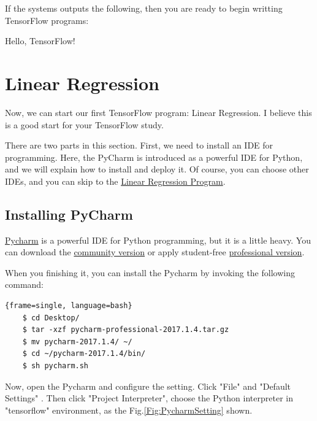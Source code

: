 \documentclass[12pt,letterpaper]{article}
\begin{document}
	If the systems outputs the following, then you are ready to begin writting TensorFlow programs:
	\begin{python}
		Hello, TensorFlow!
		\end{python}
	\section{Linear Regression}
		\label{sec:LinearReg}
	
		Now, we can start our first TensorFlow program: Linear Regression. I believe this is a good start for your TensorFlow study. \par
		There are two parts in this section. First, we need to install an IDE for programming. Here, the PyCharm is introduced as a powerful IDE for Python, and we will explain how to install and deploy it. Of course, you can choose other IDEs, and you can skip to the \hyperref[sec:LinearRegProgram]{Linear Regression Program}.
		
	\subsection{Installing PyCharm}
	
	\href{https://www.jetbrains.com/pycharm/}{Pycharm} is a powerful IDE for Python programming, but it is a little heavy. You can download the \href{https://www.jetbrains.com/pycharm/download/download-thanks.html?platform=linux&code=PCC}{community version} or apply student-free \href{https://www.jetbrains.com/pycharm/download/download-thanks.html?platform=linux}{professional version}. \par
	When you finishing it, you can install the Pycharm by invoking the following command:
	\begin{lstlisting}{frame=single, language=bash}
	$ cd Desktop/
	$ tar -xzf pycharm-professional-2017.1.4.tar.gz
	$ mv pycharm-2017.1.4/ ~/
	$ cd ~/pycharm-2017.1.4/bin/
	$ sh pycharm.sh
	\end{lstlisting}
	
	Now, open the Pycharm and configure the setting. Click "File" and "Default Settings" . Then click "Project Interpreter", choose the Python interpreter in "tensorflow" environment, as the Fig.\ref{Fig:PycharmSetting} shown.
	
\end{document}
